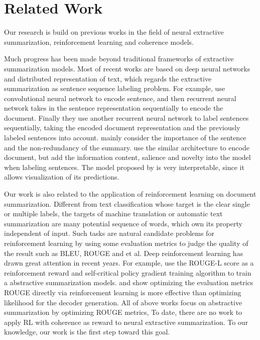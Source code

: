 \documentclass[letterpaper]{article} %
\begin{document}
	
	\section{Related Work}
	Our research is build on previous works in the field of neural extractive summarization, reinforcement learning and coherence models.
	
	Much progress has been made beyond traditional frameworks of extractive summarization models. Most of recent works are based on deep neural networks and distributed representation of text, which regards the extractive summarization as sentence sequence labeling problem. For example, \cite{jianpeng2016} use convolutional neural network to encode sentence, and then recurrent neural network takes in the sentence representation sequentially to encode the document. Finally they use another recurrent neural network to label sentences sequentially, taking the encoded document representation and the previously labeled sentences into account. \cite{jianpeng2016} mainly consider the importance of the sentence and the non-redundancy of the summary. \cite{SummaRuNNer} use the similar architecture to encode document, but add the information content, salience and novelty into the model when labeling sentences. The model proposed by \cite{SummaRuNNer} is very interpretable, since it allows visualization of its predictions. 
	
	Our work is also related to the application of reinforcement learning on document summarization. Different from text classification whose target is the clear single or multiple labels, the targets of machine translation or automatic text summarization are many potential sequence of words, which own its property independent of input. Such tasks are natural candidate problems for reinforcement learning by using some evaluation metrics to judge the quality of the result such as BLEU, ROUGE and et al. Deep reinforcement learning has drawn great attention in recent years. For example, \cite{socher2017_summarization} use the ROUGE-L score as a reinforcement reward and self-critical policy gradient training algorithm to train a abstractive summarization models. \cite{ayana2016} and \cite{sltrnn2016} show optimizing the evaluation metrics ROUGE directly via reinforcement learning is more effective than optimizing likelihood for the decoder generation. All of above works focus on abstractive summarization by optimizing ROUGE metrics, To date, there are no work to apply RL with coherence as reward to neural extractive summarization. To our knowledge, our work is the first step toward this goal.
	
\end{document}
